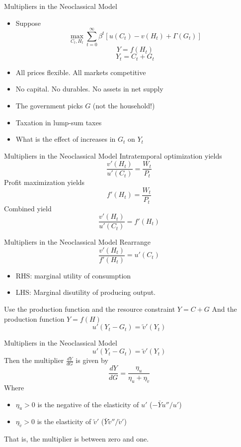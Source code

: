 \documentclass[11pt,aspectratio=169,xcolor={dvipsnames},hyperref={pdftex,pdfpagemode=UseNone,hidelinks,pdfdisplaydoctitle=true},usepdftitle=false]{beamer}
\begin{document}
\begin{frame}{Multipliers in the Neoclassical Model}
\begin{itemize}
\item Suppose
$$\max_{C_t,H_t} \sum_{t=0}^{\infty} \beta^t \left[u(C_t) - v(H_t) + \Gamma(G_t)\right]$$
\vspace{-0.5cm}
$$Y = f(H_t)$$
\vspace{-0.5cm}
$$Y_t = C_t + G_t$$
\vspace{-0.5cm}
\item All prices flexible. All markets competitive
\item No capital. No durables. No assets in net supply
\item The government picks $G$ (not the household!)
\item Taxation in lump-sum taxes
\item What is the effect of increases in $G_t$ on $Y_t$
\end{itemize}
\end{frame}



\begin{frame}{Multipliers in the Neoclassical Model}
Intratemporal optimization yields
$$\frac{v'(H_t)}{u'(C_t)} = \frac{W_t}{P_t}$$
Profit maximization yields
$$f'(H_t) = \frac{W_t}{P_t}$$
Combined yield
$$\frac{v'(H_t)}{u'(C_t)}  = f'(H_t)$$
\end{frame}


\begin{frame}{Multipliers in the Neoclassical Model}
Rearrange
$$\frac{v'(H_t)}{ f'(H_t)}  = u'(C_t)$$
\begin{itemize}
\item RHS: marginal utility of consumption
\item LHS: Marginal disutility of producing output.
\end{itemize}
\vspace{1cm}
Use the production function and the resource constraint $Y = C + G$ And the production function $Y = f(H)$
$$ u'(Y_t - G_t) = \tilde{v}'(Y_t) $$
\end{frame}


\begin{frame}{Multipliers in the Neoclassical Model}
$$ u'(Y_t - G_t) = \tilde{v}'(Y_t) $$
Then the multiplier $\frac{dY}{dG}$ is given by
$$\frac{dY}{dG} = \frac{\eta_u}{\eta_u + \eta_{\tilde{v}}}$$
Where
\begin{itemize}
\item $\eta_u > 0$ is the negative of the elasticity of $u'$ ($-\bar{Y}u''/u'$)
\item $\eta_{\tilde{v}} > 0$ is the elasticity of $\tilde{v}'$ ($\bar{Y}\tilde{v}''/\tilde{v}'$)
\end{itemize}
That is, the multiplier is between zero and one.
\end{frame}
\end{document}
